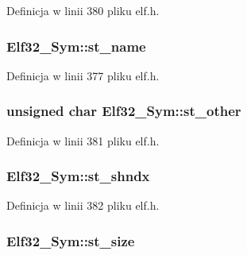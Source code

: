 Definicja w linii 380 pliku elf.\-h.

\hypertarget{struct_elf32___sym_a6a972b30868879f8a1e071e0c45e5031}{
\subsubsection[{st\-\_\-name}]{ Elf32\-\_\-\-Sym\-::st\-\_\-name}}\label{struct_elf32___sym_a6a972b30868879f8a1e071e0c45e5031}


Definicja w linii 377 pliku elf.\-h.

\hypertarget{struct_elf32___sym_a2e1bf6bedb5180f74ea8cbaf9cedfd36}{
\subsubsection[{st\-\_\-other}]{\setlength{\rightskip}{0pt plus 5cm}unsigned char Elf32\-\_\-\-Sym\-::st\-\_\-other}}\label{struct_elf32___sym_a2e1bf6bedb5180f74ea8cbaf9cedfd36}


Definicja w linii 381 pliku elf.\-h.

\hypertarget{struct_elf32___sym_abfa99b2ee1f5f6dbc5d5d348e753a7cb}{
\subsubsection[{st\-\_\-shndx}]{ Elf32\-\_\-\-Sym\-::st\-\_\-shndx}}\label{struct_elf32___sym_abfa99b2ee1f5f6dbc5d5d348e753a7cb}


Definicja w linii 382 pliku elf.\-h.

\hypertarget{struct_elf32___sym_a1b410e69fecd2610bc7e58d2b0245053}{
\subsubsection[{st\-\_\-size}]{ Elf32\-\_\-\-Sym\-::st\-\_\-size}}\label{struct_elf32___sym_a1b410e69fecd2610bc7e58d2b0245053}


